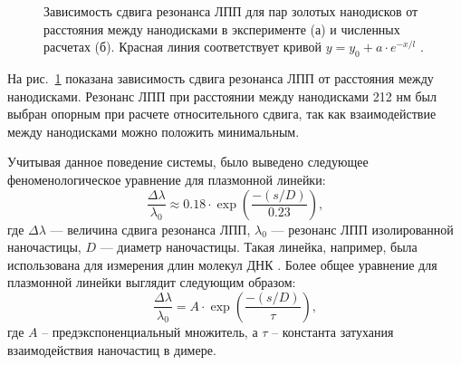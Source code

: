 \begin{figure}[t]
\caption{Зависимость сдвига резонанса ЛПП для пар золотых нанодисков от расстояния между нанодисками в эксперименте (а) и численных расчетах (б). Красная линия соответствует кривой $ y = y_0 + a \cdot e^{-x/l} $  \cite{plasonrulereq}.}
\label{img:PR_ruler}
\end{figure}

На рис.~\ref{img:PR_ruler} показана зависимость сдвига резонанса ЛПП от расстояния между нанодисками. Резонанс ЛПП при расстоянии между нанодисками 212 нм был выбран опорным при расчете относительного сдвига, так как взаимодействие между нанодисками можно положить минимальным.

Учитывая данное поведение системы, было выведено следующее феноменологическое уравнение для плазмонной линейки:
\begin{equation}
\frac{\Delta \lambda}{\lambda_0} \approx 0.18 \cdot \exp \left( \frac{-(s/D)}{0.23} \right),
\label{eq:plasmon_ruler}
\end{equation}
где $ \Delta \lambda $ --- величина сдвига резонанса ЛПП, $ \lambda_0 $ --- резонанс ЛПП изолированной наночастицы, $ D $ --- диаметр наночастицы. Такая линейка, например, была использована для измерения длин молекул ДНК \cite{bioplasmonruler3}. Более общее уравнение для плазмонной линейки выглядит следующим образом:
\begin{equation}
\frac{\Delta \lambda}{\lambda_0} = A \cdot \exp \left( \frac{-(s/D)}{\tau} \right),
\label{eq:ruler_general}
\end{equation}
где $ A $ -- предэкспоненциальный множитель, а $ \tau $ -- константа затухания взаимодействия наночастиц в димере.

